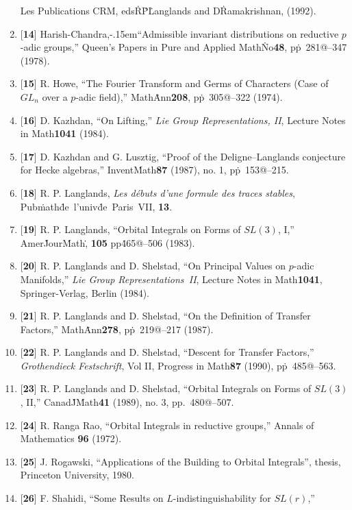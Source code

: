 \documentclass{amsart}
\begin{document}
\begin{enumerate}
  Les Publications CRM, eds\. R\. P\. Langlands and
  D\. Ramakrishnan, (1992).
%
\item{[{\bf 14}]}
  Harish-Chandra\hbox{,\kern-.15em``}Admissible invariant distributions on reductive $p$-adic 
    groups,''
  Queen's Papers in Pure and Applied Math\. No\. {\bf 48}, pp\.~281@--347
  (1978).
%
\item{[{\bf 15}]}
  R. Howe,
  ``The Fourier Transform and Germs of Characters (Case of $GL_n$ 
    over a $p$-adic field),''
  Math\. Ann\. {\bf 208}, pp\.~305@--322 (1974).
%
\item{[{\bf 16}]}
  D. Kazhdan,
  ``On Lifting,'' {\sl Lie Group Representations, II},
  Lecture Notes in Math\. {\bf 1041} (1984).
%
\item{[{\bf 17}]}
  D. Kazhdan and G. Lusztig,
  ``Proof of the Deligne--Langlands conjecture for Hecke algebras,''
  Invent\. Math\. {\bf 87} (1987), no. 1, pp\.~153@--215.
%
\item{[{\bf 18}]}
  R. P. Langlands,
  {\sl Les d\'ebuts d'une formule des traces stables},
  Pub\. math\. de~l'univ\. de~Paris~VII, {\bf 13}.
%
\item{[{\bf 19}]}
  R. P. Langlands,
  ``Orbital Integrals on Forms of $SL(3)$, I,''
  Amer\. Jour\. Math\., {\bf 105} pp\. 465@--506
  (1983).
%
\item{[{\bf 20}]}
  R. P. Langlands and D. Shelstad,
  ``On Principal Values on $p$-adic Manifolds,''
  {\sl Lie Group Representations~II}, Lecture Notes in Math\.
  {\bf 1041}, Springer-Verlag, Berlin (1984).
%
\item{[{\bf 21}]}
  R. P. Langlands and D. Shelstad,
  ``On the Definition of Transfer Factors,''
  Math\. Ann\. {\bf 278}, pp\.~219@--217 (1987).
%
\item{[{\bf 22}]}
  R. P. Langlands and D. Shelstad,
  ``Descent for Transfer Factors,''
  {\sl Grothendieck Festschrift}, Vol II,
  Progress in Math\. {\bf 87} (1990), pp\.~485@--563.
%
\item{[{\bf 23}]}
  R. P. Langlands and D. Shelstad,
  ``Orbital Integrals on Forms of $SL(3)$, II,''
  Canad\. J\. Math\. {\bf 41} (1989), no. 3, pp.~480@--507.
%  
\item{[{\bf 24}]}
  R. Ranga Rao,
  ``Orbital Integrals in reductive groups,''
  Annals of Mathematics {\bf 96} (1972).
%
\item{[{\bf 25}]}
  J. Rogawski,
  ``Applications of the Building to Orbital Integrals'',
  thesis, Princeton University, 1980.
%
\item{[{\bf 26}]}
  F. Shahidi,
  ``Some Results on $L$-indistinguishability for $SL(r)$,''

\end{enumerate}
\end{document}
